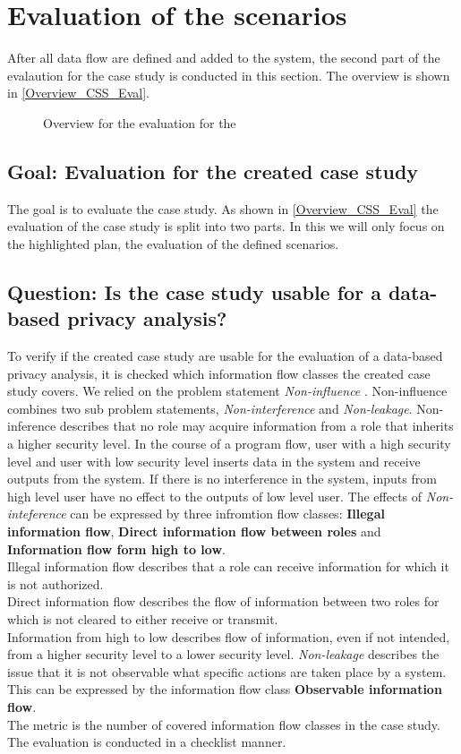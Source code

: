 \section{Evaluation of the scenarios}
After all data flow are defined and added to the system, the second part of the evalaution for the case study is conducted in this section. The overview is shown in \autoref{Overview_CSS_Eval}. 
\begin{figure}
\caption{Overview for the evaluation for the }
\label{Overview_CSS_Eval}
\end{figure}
\subsection{Goal: Evaluation for the created case study}
The goal is to evaluate the case study. As shown in \autoref{Overview_CSS_Eval} the evaluation of the case study is split into two parts. In this we will only focus on the highlighted plan, the evaluation of the defined scenarios.
\subsection{Question: Is the case study usable for a data-based privacy analysis?}
To verify if the created case study are usable for the evaluation of a data-based privacy analysis, it is checked which information flow classes the created case study covers. We relied on the problem statement \textit{Non-influence} \cite{Noninfluence}. Non-influence combines two sub problem statements, \textit{Non-interference} and \textit{Non-leakage}. Non-inference describes that no role may acquire information from a role that inherits a higher security level. In the course of a program flow, user with a high security level and user with low security level inserts data in the system and receive outputs from the system. If there is no interference in the system, inputs from high level user have no effect to the outputs of low level user. The effects of \textit{Non-inteference} can be expressed by three infromtion flow classes: \textbf{Illegal information flow}, \textbf{Direct information flow between roles} and \textbf{Information flow form high to low}. \\
Illegal information flow describes that a role can receive information for which it is not authorized.\\
Direct information flow describes the flow of information between two roles for which  is not cleared to either receive or transmit.\\
Information from high to low describes flow of information, even if not intended, from a higher security level to a lower security level.
\textit{Non-leakage} describes the issue that it is not observable what specific actions are taken place by a system. This can be expressed by the information flow class \textbf{Observable information flow}.\\
The metric is the number of covered information flow classes in the case study. The evaluation is conducted in a checklist manner. 

